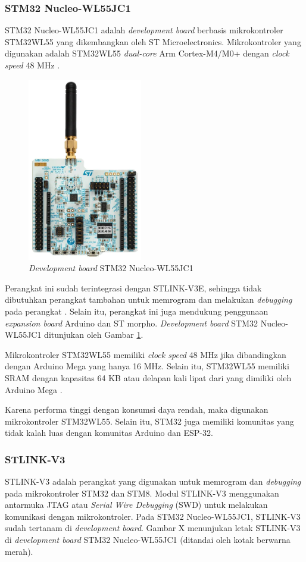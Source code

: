 \subsubsection{STM32 Nucleo-WL55JC1}
STM32 Nucleo-WL55JC1 adalah \textit{development board} berbasis mikrokontroler STM32WL55 yang  dikembangkan oleh ST Microelectronics. Mikrokontroler yang digunakan adalah STM32WL55  \textit{dual-core }Arm Cortex-M4/M0+ dengan \textit{clock speed} 48 MHz \cite{STMicroelectronics2022a}.

\begin{figure}[ht]
	\centering
	\includegraphics[width=5cm]{contents/chapter-2/stm32-wl55jc1.jpg}
	\caption{\textit{Development board} STM32 Nucleo-WL55JC1}
	\label{Fig: STM32 Nucleo-WL55JC1}
\end{figure}

Perangkat ini sudah terintegrasi dengan STLINK-V3E, sehingga tidak dibutuhkan perangkat tambahan untuk memrogram dan melakukan \textit{debugging} pada perangkat \cite{STMicroelectronics2022}. Selain itu, perangkat ini juga mendukung penggunaan \textit{expansion board} Arduino dan ST morpho. \textit{Development board} STM32 Nucleo-WL55JC1 ditunjukan oleh Gambar \ref{Fig: STM32 Nucleo-WL55JC1}.

Mikrokontroler STM32WL55 memiliki \textit{clock speed} 48 MHz jika dibandingkan dengan Arduino Mega yang hanya 16 MHz. Selain itu, STM32WL55 memiliki SRAM dengan kapasitas 64 KB atau delapan kali lipat dari yang dimiliki oleh Arduino Mega \cite{STMicroelectronics2022b}.

Karena performa tinggi dengan konsumsi daya rendah, maka digunakan mikrokontroler STM32WL55. Selain itu, STM32 juga memiliki komunitas yang tidak kalah luas dengan komunitas Arduino dan ESP-32.

\subsubsection{STLINK-V3}
STLINK-V3 adalah perangkat yang digunakan untuk memrogram dan \textit{debugging} pada mikrokontroler STM32 dan STM8. Modul STLINK-V3 menggunakan antarmuka JTAG atau \textit{Serial Wire Debugging} (SWD) untuk melakukan komunikasi dengan mikrokontroler. Pada STM32 Nucleo-WL55JC1, STLINK-V3 sudah tertanam di \textit{development board}. Gambar X menunjukan letak STLINK-V3 di \textit{development board} STM32 Nucleo-WL55JC1 (ditandai oleh kotak berwarna merah).

